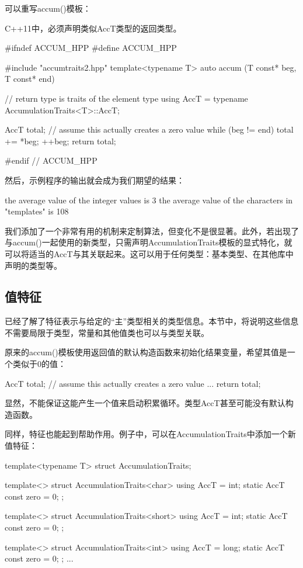 可以重写accum()模板：

\begin{notice}
C++11中，必须声明类似AccT类型的返回类型。
\end{notice}

\begin{cpp}
#ifndef ACCUM_HPP
#define ACCUM_HPP

#include "accumtraits2.hpp"
template<typename T>
auto accum (T const* beg, T const* end) {
	// return type is traits of the element type
	using AccT = typename AccumulationTraits<T>::AccT;
	
	AccT total{}; // assume this actually creates a zero value
	while (beg != end) {
		total += *beg;
		++beg;
	}
	return total;
}

#endif // ACCUM_HPP
\end{cpp}

然后，示例程序的输出就会成为我们期望的结果：

\begin{shell}
the average value of the integer values is 3
the average value of the characters in "templates" is 108
\end{shell}

我们添加了一个非常有用的机制来定制算法，但变化不是很显著。此外，若出现了与accum()一起使用的新类型，只需声明AccumulationTraits模板的显式特化，就可以将适当的AccT与其关联起来。这可以用于任何类型：基本类型、在其他库中声明的类型等。

\subsection{值特征}

已经了解了特征表示与给定的“主”类型相关的类型信息。本节中，将说明这些信息不需要局限于类型，常量和其他值类也可以与类型关联。

原来的accum()模板使用返回值的默认构造函数来初始化结果变量，希望其值是一个类似于0的值：

\begin{cpp}
AccT total{}; // assume this actually creates a zero value
...
return total;
\end{cpp}

显然，不能保证这能产生一个值来启动积累循环。类型AccT甚至可能没有默认构造函数。

同样，特征也能起到帮助作用。例子中，可以在AccumulationTraits中添加一个新值特征：

\begin{cpp}
template<typename T>
struct AccumulationTraits;

template<>
struct AccumulationTraits<char> {
	using AccT = int;
	static AccT const zero = 0;
};

template<>
struct AccumulationTraits<short> {
	using AccT = int;
	static AccT const zero = 0;
};

template<>
struct AccumulationTraits<int> {
	using AccT = long;
	static AccT const zero = 0;
};
...
\end{cpp}

